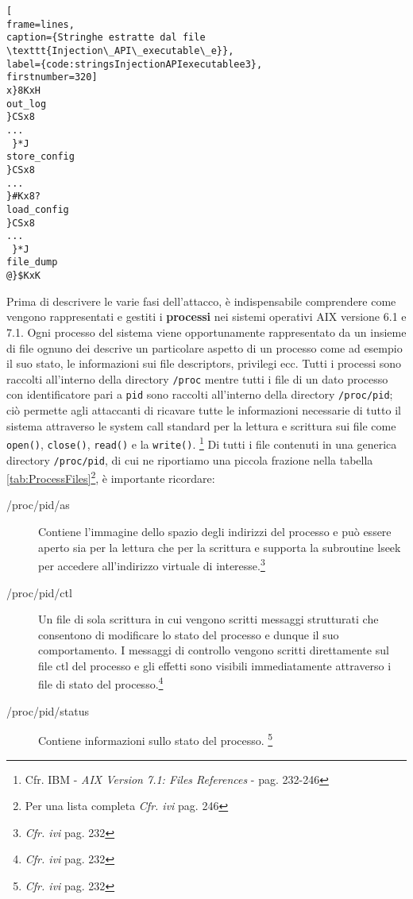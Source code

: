 \documentclass[10pt,a4paper, titlepage]{report}
\begin{document}
\begin{lstlisting}[
frame=lines, 
caption={Stringhe estratte dal file \texttt{Injection\_API\_executable\_e}}, 
label={code:stringsInjectionAPIexecutablee3},
firstnumber=320]
x}8KxH
out_log
}CSx8
...
 }*J
store_config
}CSx8
...
}#Kx8?
load_config
}CSx8
...
 }*J
file_dump
@}$KxK
\end{lstlisting}


Prima di descrivere le varie fasi dell'attacco, è indispensabile comprendere come vengono rappresentati e gestiti i \textbf{processi} nei sistemi operativi AIX versione 6.1 e 7.1. 
Ogni processo del sistema viene opportunamente rappresentato da un insieme di file ognuno dei descrive un particolare aspetto di un processo come ad esempio il suo stato, le informazioni sui file descriptors, privilegi ecc.
Tutti i processi sono raccolti all'interno della directory \texttt{/proc} mentre tutti i file di un dato processo con identificatore pari a \texttt{pid} sono raccolti all'interno della directory \texttt{/proc/pid}; ciò permette agli attaccanti di
ricavare tutte le informazioni necessarie di tutto il sistema attraverso le system call standard per la lettura e scrittura sui file come \texttt{open()}, \texttt{close()}, \texttt{read()} e la \texttt{write()}. \footnote{Cfr. IBM - \textit{AIX Version 7.1: Files References} - pag. 232-246}
Di tutti i file contenuti in una generica directory \texttt{/proc/pid}, di cui ne riportiamo una piccola frazione nella tabella \ref{tab:ProcessFiles}\footnote{Per una lista completa \textit{Cfr. ivi} pag. 246}, è importante ricordare:

\begin{description}
\item[/proc/pid/as] Contiene l'immagine dello spazio degli indirizzi del processo e può essere aperto sia per la lettura che per la scrittura e supporta la subroutine lseek per accedere all'indirizzo virtuale di interesse.\footnote{\textit{Cfr. ivi} pag. 232}

\item[/proc/pid/ctl] Un file di sola scrittura in cui vengono scritti messaggi strutturati che consentono di modificare lo stato del processo e dunque il suo comportamento. I messaggi di controllo vengono scritti direttamente sul file ctl del processo e gli effetti sono visibili immediatamente attraverso i file di stato del processo.\footnote{\textit{Cfr. ivi} pag. 232}

\item[/proc/pid/status] Contiene informazioni sullo stato del processo. \footnote{\textit{Cfr. ivi} pag. 232}
\end{description}
\end{document}
